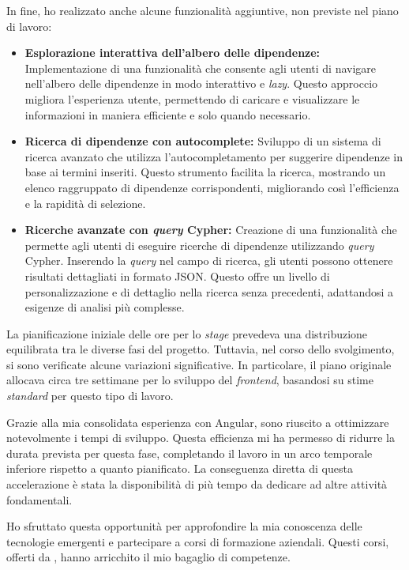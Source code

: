 In fine, ho realizzato anche alcune funzionalità aggiuntive, non previste nel piano di lavoro:
\begin{itemize}
  \item \textbf{Esplorazione interattiva dell'albero delle dipendenze:} Implementazione di una funzionalità che consente 
  agli utenti di navigare nell'albero delle dipendenze in modo interattivo e \textit{lazy}. 
  Questo approccio migliora l'esperienza utente, permettendo di caricare e visualizzare le informazioni in maniera 
  efficiente e solo quando necessario.
  \item \textbf{Ricerca di dipendenze con autocomplete:} Sviluppo di un sistema di ricerca avanzato che utilizza 
  l'autocompletamento per suggerire dipendenze in base ai termini inseriti. 
  Questo strumento facilita la ricerca, mostrando un elenco raggruppato di dipendenze corrispondenti,
   migliorando così l'efficienza e la rapidità di selezione.
  \item \textbf{Ricerche avanzate con \textit{query} Cypher:} Creazione di una funzionalità che permette agli utenti di eseguire 
  ricerche di dipendenze utilizzando \textit{query} Cypher. Inserendo la \textit{query} nel campo di ricerca, 
  gli utenti possono ottenere risultati dettagliati in formato JSON. Questo offre un livello di personalizzazione e di 
  dettaglio nella ricerca senza precedenti, adattandosi a esigenze di analisi più complesse.
  \end{itemize}
La pianificazione iniziale delle ore per lo \textit{stage} prevedeva una distribuzione equilibrata tra le diverse fasi del progetto. 
Tuttavia, nel corso dello svolgimento, 
si sono verificate alcune variazioni significative. In particolare, il piano originale allocava circa tre settimane per lo sviluppo 
del \textit{frontend}, basandosi su stime \textit{standard} per questo tipo di lavoro.

Grazie alla mia consolidata esperienza con Angular, sono riuscito a ottimizzare notevolmente i tempi di sviluppo. 
Questa efficienza mi ha permesso di ridurre la durata prevista per questa fase, completando il lavoro in un arco temporale 
inferiore rispetto a quanto pianificato. La conseguenza diretta di questa accelerazione è stata la disponibilità di più 
tempo da dedicare ad altre attività fondamentali.

Ho sfruttato questa opportunità per approfondire la mia conoscenza delle tecnologie emergenti e partecipare a corsi di 
formazione aziendali. Questi corsi, offerti da \azienda{}, hanno arricchito il mio bagaglio di competenze.

